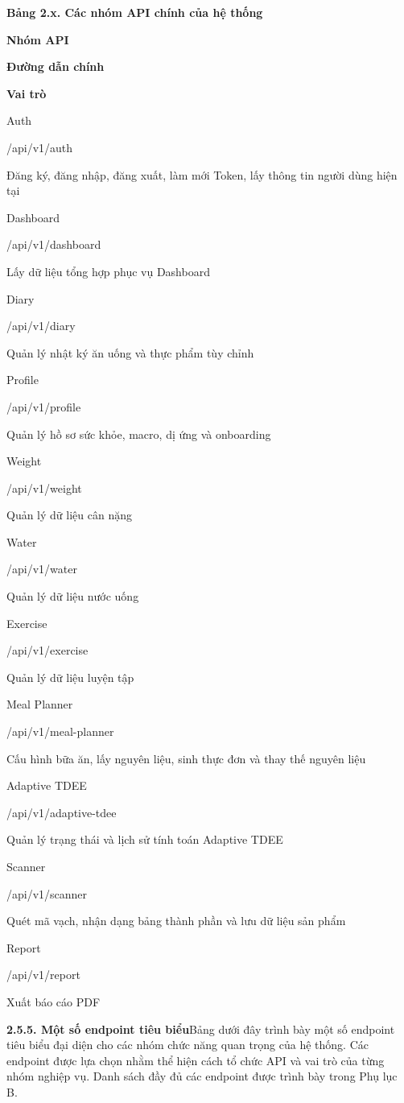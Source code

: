\textbf{Bảng 2.x. Các nhóm API chính của hệ thống}

\textbf{Nhóm API}

\textbf{Đường dẫn chính}

\textbf{Vai trò}

Auth

/api/v1/auth

Đăng ký, đăng nhập, đăng xuất, làm mới Token, lấy thông tin người dùng hiện tại

Dashboard

/api/v1/dashboard

Lấy dữ liệu tổng hợp phục vụ Dashboard

Diary

/api/v1/diary

Quản lý nhật ký ăn uống và thực phẩm tùy chỉnh

Profile

/api/v1/profile

Quản lý hồ sơ sức khỏe, macro, dị ứng và onboarding

Weight

/api/v1/weight

Quản lý dữ liệu cân nặng

Water

/api/v1/water

Quản lý dữ liệu nước uống

Exercise

/api/v1/exercise

Quản lý dữ liệu luyện tập

Meal Planner

/api/v1/meal-planner

Cấu hình bữa ăn, lấy nguyên liệu, sinh thực đơn và thay thế nguyên liệu

Adaptive TDEE

/api/v1/adaptive-tdee

Quản lý trạng thái và lịch sử tính toán Adaptive TDEE

Scanner

/api/v1/scanner

Quét mã vạch, nhận dạng bảng thành phần và lưu dữ liệu sản phẩm

Report

/api/v1/report

Xuất báo cáo PDF

\textbf{2.5.5. Một số endpoint tiêu biểu}Bảng dưới đây trình bày một số endpoint tiêu biểu đại diện cho các nhóm chức năng quan trọng của hệ thống. Các endpoint được lựa chọn nhằm thể hiện cách tổ chức API và vai trò của từng nhóm nghiệp vụ. Danh sách đầy đủ các endpoint được trình bày trong Phụ lục B.

